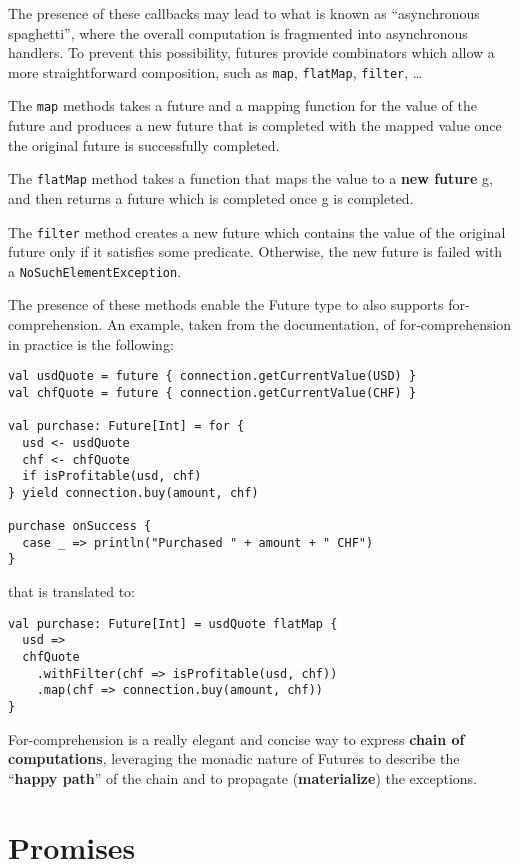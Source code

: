 The presence of these callbacks may lead to what is known as
``asynchronous spaghetti'', where the overall computation is fragmented
into asynchronous handlers. To prevent this possibility, futures provide
combinators which allow a more straightforward composition, such as
\texttt{map}, \texttt{flatMap}, \texttt{filter}, \ldots{}

The \texttt{map} methods takes a future and a mapping function for the
value of the future and produces a new future that is completed with the
mapped value once the original future is successfully completed.

The \texttt{flatMap} method takes a function that maps the value to a
\textbf{new future} g, and then returns a future which is completed once
g is completed.

The \texttt{filter} method creates a new future which contains the value
of the original future only if it satisfies some predicate. Otherwise,
the new future is failed with a \texttt{NoSuchElementException}.

The presence of these methods enable the Future type to also supports
for-comprehension. An example, taken from the documentation, of
for-comprehension in practice is the following:

\begin{verbatim}
val usdQuote = future { connection.getCurrentValue(USD) }
val chfQuote = future { connection.getCurrentValue(CHF) }

val purchase: Future[Int] = for {
  usd <- usdQuote
  chf <- chfQuote
  if isProfitable(usd, chf)
} yield connection.buy(amount, chf)

purchase onSuccess {
  case _ => println("Purchased " + amount + " CHF")
}
\end{verbatim}

that is translated to:

\begin{verbatim}
val purchase: Future[Int] = usdQuote flatMap {
  usd =>
  chfQuote
    .withFilter(chf => isProfitable(usd, chf))
    .map(chf => connection.buy(amount, chf))
}
\end{verbatim}

For-comprehension is a really elegant and concise way to express
\textbf{chain of computations}, leveraging the monadic nature of Futures
to describe the ``\textbf{happy path}'' of the chain and to propagate
(\textbf{materialize}) the exceptions.


\section{Promises}\label{promises}

